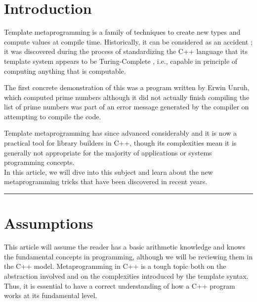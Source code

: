 \section*{Introduction}

Template metaprogramming is a family of techniques to create new types and compute values at 
compile time. Historically, it can be considered as an accident ; it was discovered during the 
process of standardizing the C++ language that its template system appears to be Turing-Complete
, i.e., capable in principle of computing anything that is computable.

The first concrete demonstration of this was a program written by Erwin Unruh, which computed 
prime numbers although it did not actually finish compiling the list of prime numbers was 
part of an error message generated by the compiler on attempting to compile the code.

Template metaprogramming has since advanced considerably and it is now a practical tool for 
library builders in C++, though its complexities mean it is generally not appropriate for the 
majority of applications  or systems programming concepts. \\

In this article, we will dive into this subject and learn about the new metaprogramming 
tricks that have been discovered in recent years.

\vspace{60pt}


\textcolor{black}{\rule{16cm}{0.2mm}}

\section*{Assumptions}

This article will assume the reader has a basic arithmetic knowledge and knows the fundamental concepts in programming, although we will be reviewing them in the C++ model. Metaprogramming in C++ is a tough topic both on the abstraction involved and on the complexities introduced by the template syntax. Thus, it is essential to have a correct understanding of how a C++ program works at its fundamental level. \\

